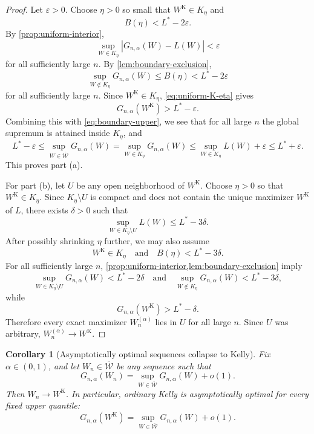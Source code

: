 \documentclass[11pt]{article}
\newtheorem{corollary}[corollary]{Corollary}
\theoremstyle{definition}
\newcommand{\1}{\mathbf{1}}
\begin{document}
\begin{proof}
Let $\varepsilon>0$. Choose $\eta>0$ so small that $W^{\mathrm K}\in K_\eta$ and
\begin{equation}\label{eq:eta-choice-value}
B(\eta)<L^*-2\varepsilon.
\end{equation}
By \cref{prop:uniform-interior},
\begin{equation}\label{eq:uniform-K-eta}
\sup_{W\in K_\eta} |G_{n,\alpha}(W)-L(W)|<\varepsilon
\end{equation}
for all sufficiently large $n$. By \cref{lem:boundary-exclusion},
\begin{equation}\label{eq:boundary-upper}
\sup_{W\notin K_\eta} G_{n,\alpha}(W)\le B(\eta)<L^*-2\varepsilon
\end{equation}
for all sufficiently large $n$. Since $W^{\mathrm K}\in K_\eta$, \eqref{eq:uniform-K-eta} gives
\[
G_{n,\alpha}(W^{\mathrm K})>L^*-\varepsilon.
\]
Combining this with \eqref{eq:boundary-upper}, we see that for all large $n$ the global supremum is attained inside $K_\eta$, and
\[
L^*-\varepsilon
\le \sup_{W\in\overline{\mathcal W}} G_{n,\alpha}(W)
= \sup_{W\in K_\eta} G_{n,\alpha}(W)
\le \sup_{W\in K_\eta} L(W)+\varepsilon
\le L^*+\varepsilon.
\]
This proves part (a).

For part (b), let $U$ be any open neighborhood of $W^{\mathrm K}$. Choose $\eta>0$ so that $W^{\mathrm K}\in K_\eta$. Since $K_\eta\setminus U$ is compact and does not contain the unique maximizer $W^{\mathrm K}$ of $L$, there exists $\delta>0$ such that
\begin{equation}\label{eq:gap-away-U}
\sup_{W\in K_\eta\setminus U} L(W)\le L^*-3\delta.
\end{equation}
After possibly shrinking $\eta$ further, we may also assume
\begin{equation}\label{eq:boundary-gap-U}
W^{\mathrm K}\in K_\eta
\quad\text{and}\quad
B(\eta)<L^*-3\delta.
\end{equation}
For all sufficiently large $n$, \cref{prop:uniform-interior,lem:boundary-exclusion} imply
\[
\sup_{W\in K_\eta\setminus U} G_{n,\alpha}(W)<L^*-2\delta
\quad\text{and}\quad
\sup_{W\notin K_\eta} G_{n,\alpha}(W)<L^*-3\delta,
\]
while
\[
G_{n,\alpha}(W^{\mathrm K})>L^*-\delta.
\]
Therefore every exact maximizer $W_n^{(\alpha)}$ lies in $U$ for all large $n$. Since $U$ was arbitrary, $W_n^{(\alpha)}\to W^{\mathrm K}$.
\end{proof}

\begin{corollary}[Asymptotically optimal sequences collapse to Kelly]\label{cor:asymptotically-optimal}
Fix $\alpha\in(0,1)$, and let $W_n\in\overline{\mathcal W}$ be any sequence such that
\[
G_{n,\alpha}(W_n)=\sup_{W\in\overline{\mathcal W}} G_{n,\alpha}(W)+o(1).
\]
Then $W_n\to W^{\mathrm K}$. In particular, ordinary Kelly is asymptotically optimal for every fixed upper quantile:
\[
G_{n,\alpha}(W^{\mathrm K})=\sup_{W\in\overline{\mathcal W}} G_{n,\alpha}(W)+o(1).
\]
\end{corollary}
\end{document}
